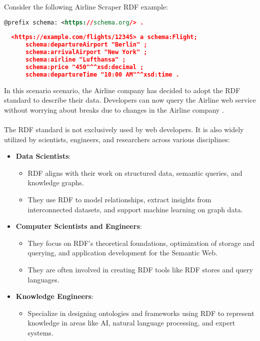 Consider the following Airline Scraper RDF example:
\begin{lstlisting}[language=XML, caption={RDF representation of the flight data}, label={lst:rdf-example}, frame=single]
  @prefix schema: <https://schema.org/> .
  
  <https://example.com/flights/12345> a schema:Flight;
      schema:departureAirport "Berlin" ;
      schema:arrivalAirport "New York" ;
      schema:airline "Lufthansa" ;
      schema:price "450"^^xsd:decimal ;
      schema:departureTime "10:00 AM"^^xsd:time .
  \end{lstlisting}
  In this scenario scenario, the Airline company has decided to adopt the RDF standard to describe their data.
  Developers can now query the Airline web service without worrying about breaks due to changes in the Airline company \cite{herman2003semanticweb}. 
\\
\\
The RDF standard is not exclusively used by web developers. It is also widely utilized by scientists, engineers, and researchers across various disciplines:
\begin{itemize}
  \item \textbf{Data Scientists}:
  \begin{itemize}
      \item RDF aligns with their work on structured data, semantic queries, and knowledge graphs.
      \item They use RDF to model relationships, extract insights from interconnected datasets, and support machine learning on graph data.
  \end{itemize}
  
  \item \textbf{Computer Scientists and Engineers}:
  \begin{itemize}
      \item They focus on RDF’s theoretical foundations, optimization of storage and querying, and application development for the Semantic Web.
      \item They are often involved in creating RDF tools like RDF stores and query languages.
  \end{itemize}
  
  \item \textbf{Knowledge Engineers}:
  \begin{itemize}
      \item Specialize in designing ontologies and frameworks using RDF to represent knowledge in areas like AI, natural language processing, and expert systems.
  \end{itemize}
\end{itemize}

